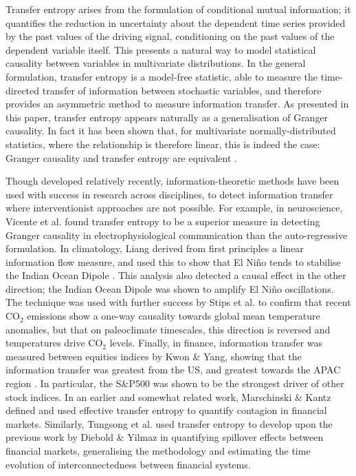 \documentclass[]{rsos}%
\begin{document}
{  Transfer entropy arises from the formulation of conditional mutual information; it quantifies the reduction in uncertainty about the dependent time series provided by the past values of the driving signal, conditioning on the past values of the dependent variable itself. This presents a natural way to model statistical causality between variables in multivariate distributions. In the general formulation, transfer entropy is a model-free statistic, able to measure the time-directed transfer of information between stochastic variables, and therefore provides an asymmetric method to measure information transfer. As presented in this paper, transfer entropy appears naturally as a generalisation of Granger causality. In fact it has been shown that, for multivariate normally-distributed statistics, where the relationship is therefore linear, this is indeed the case: Granger causality and transfer entropy are equivalent \cite{barnett2009granger}.

  Though developed relatively recently, information-theoretic methods have been used with success in research across disciplines, to detect information transfer where interventionist approaches are not possible. For example, in neuroscience, Vicente et al. \cite{vicente2011transfer} found transfer entropy to be a superior measure in detecting Granger causality in electrophysiological communication than the auto-regressive formulation. In climatology, Liang derived from first principles a linear information flow measure, and used this to show that El Ni\~{n}o tends to stabilise the Indian Ocean Dipole \cite{san2014unraveling}. This analysis also detected a causal effect in the other direction; the Indian Ocean Dipole was shown to amplify El Ni\~{n}o oscillations. The technique was used with further success by Stips et al. \cite{stips2016causal} to confirm that recent CO$_2$ emissions show a one-way causality towards global mean temperature anomalies, but that on paleoclimate timescales, this direction is reversed and temperatures drive CO$_2$ levels. Finally, in finance, information transfer was measured between equities indices by Kwon \& Yang, showing that the information transfer was greatest from the US, and greatest towards the APAC region \cite{kwon2008information}. In particular, the S\&P500 was shown to be the strongest driver of other stock indices. In an earlier and somewhat related work, Marschinski \& Kantz   \cite{Marschinski2002} defined and used effective transfer entropy to quantify contagion in financial markets. Similarly, Tungsong et al. \cite{tungsong2018} used transfer entropy to develop upon the previous work by Diebold \& Yilmaz \cite{diebold2009measuring} in quantifying spillover effects between financial markets, generalising the methodology and estimating the time evolution of interconnectedness between financial systems.

}
\end{document}
